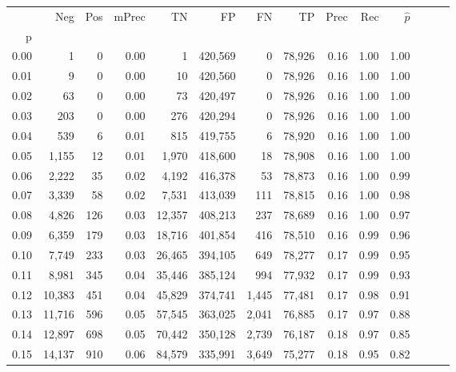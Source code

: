 \begin{tabular}{rrrrrrrrrrrrrr}
\toprule
{} &     Neg &    Pos & mPrec &       TN &       FP &      FN &      TP &  Prec &   Rec & $\hat{p}$ \\
p    &         &        &       &          &          &         &         &       &       &           \\
\midrule
0.00 &       1 &      0 &  0.00 &        1 &  420,569 &       0 &  78,926 &  0.16 &  1.00 &      1.00 \\
0.01 &       9 &      0 &  0.00 &       10 &  420,560 &       0 &  78,926 &  0.16 &  1.00 &      1.00 \\
0.02 &      63 &      0 &  0.00 &       73 &  420,497 &       0 &  78,926 &  0.16 &  1.00 &      1.00 \\
0.03 &     203 &      0 &  0.00 &      276 &  420,294 &       0 &  78,926 &  0.16 &  1.00 &      1.00 \\
0.04 &     539 &      6 &  0.01 &      815 &  419,755 &       6 &  78,920 &  0.16 &  1.00 &      1.00 \\
0.05 &   1,155 &     12 &  0.01 &    1,970 &  418,600 &      18 &  78,908 &  0.16 &  1.00 &      1.00 \\
0.06 &   2,222 &     35 &  0.02 &    4,192 &  416,378 &      53 &  78,873 &  0.16 &  1.00 &      0.99 \\
0.07 &   3,339 &     58 &  0.02 &    7,531 &  413,039 &     111 &  78,815 &  0.16 &  1.00 &      0.98 \\
0.08 &   4,826 &    126 &  0.03 &   12,357 &  408,213 &     237 &  78,689 &  0.16 &  1.00 &      0.97 \\
0.09 &   6,359 &    179 &  0.03 &   18,716 &  401,854 &     416 &  78,510 &  0.16 &  0.99 &      0.96 \\
0.10 &   7,749 &    233 &  0.03 &   26,465 &  394,105 &     649 &  78,277 &  0.17 &  0.99 &      0.95 \\
0.11 &   8,981 &    345 &  0.04 &   35,446 &  385,124 &     994 &  77,932 &  0.17 &  0.99 &      0.93 \\
0.12 &  10,383 &    451 &  0.04 &   45,829 &  374,741 &   1,445 &  77,481 &  0.17 &  0.98 &      0.91 \\
0.13 &  11,716 &    596 &  0.05 &   57,545 &  363,025 &   2,041 &  76,885 &  0.17 &  0.97 &      0.88 \\
0.14 &  12,897 &    698 &  0.05 &   70,442 &  350,128 &   2,739 &  76,187 &  0.18 &  0.97 &      0.85 \\
0.15 &  14,137 &    910 &  0.06 &   84,579 &  335,991 &   3,649 &  75,277 &  0.18 &  0.95 &      0.82 \\

\end{tabular}
